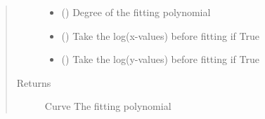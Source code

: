 \documentclass[letterpaper,10pt,english]{sphinxmanual}
\begin{document}
\begin{fulllineitems}
\begin{quote}
\begin{description}
\begin{itemize}
\item {} 
 () \textendash{} Degree of the fitting polynomial

\item {} 
 () \textendash{} Take the log(x-values) before fitting if True

\item {} 
 () \textendash{} Take the log(y-values) before fitting if True

\end{itemize}

\item[{Returns}] \leavevmode
Curve \textendash{} The fitting polynomial

\end{description}\end{quote}

\end{fulllineitems}

\end{document}

